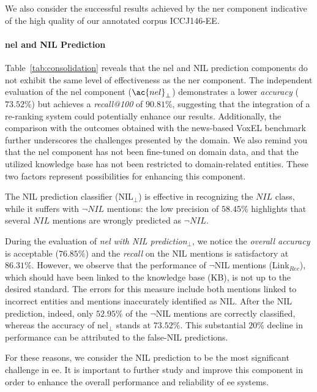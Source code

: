 We also consider the successful results achieved by the \ac{ner} component indicative of the high quality of our annotated corpus ICCJ146-EE.



\paragraph{\ac{nel} and NIL Prediction}

Table~\ref{tab:consolidation} reveals that the \ac{nel} and NIL prediction components do not exhibit the same level of effectiveness as the \ac{ner} component. The independent evaluation of the \ac{nel} component ($\ac{nel}_\perp$) demonstrates a lower \textit{accuracy} ($73.52\%$) but achieves a \textit{recall@100} of $90.81\%$, suggesting that the integration of a re-ranking system could potentially enhance our results. Additionally, the comparison with the outcomes obtained with the news-based VoxEL benchmark~\cite{rosales2018voxel} further underscores the challenges presented by the domain. We also remind you that the \ac{nel} component has not been fine-tuned on domain data, and that the utilized knowledge base has not been restricted to domain-related entities. These two factors represent possibilities for enhancing this component.

The NIL prediction classifier (NIL$_\perp$) is effective in recognizing the $NIL$ class, while it suffers with $\neg{NIL}$ mentions: the low precision of $58.45\%$ highlights that several $NIL$ mentions are wrongly predicted as $\neg{NIL}$.


During the evaluation of \textit{\ac{nel} with NIL prediction$_\perp$}, we notice the \textit{overall accuracy} is acceptable ($76.85\%$) and the \textit{recall} on the NIL mentions is satisfactory at $86.31\%$. However, we observe that the performance of $\neg$NIL mentions (Link$_{Rec}$), which should have been linked to the knowledge base (KB), is not up to the desired standard. The errors for this measure include both mentions linked to incorrect entities and mentions inaccurately identified as NIL. After the NIL prediction, indeed, only $52.95\%$ of the $\neg$NIL mentions are correctly classified, whereas the accuracy of \ac{nel}$_\perp$ stands at $73.52\%$. This substantial $20\%$ decline in performance can be attributed to the false-NIL predictions.

For these reasons, we consider the NIL prediction to be the most significant challenge in \ac{ee}. It is important to further study and improve this component in order to enhance the overall performance and reliability of \ac{ee} systems.


